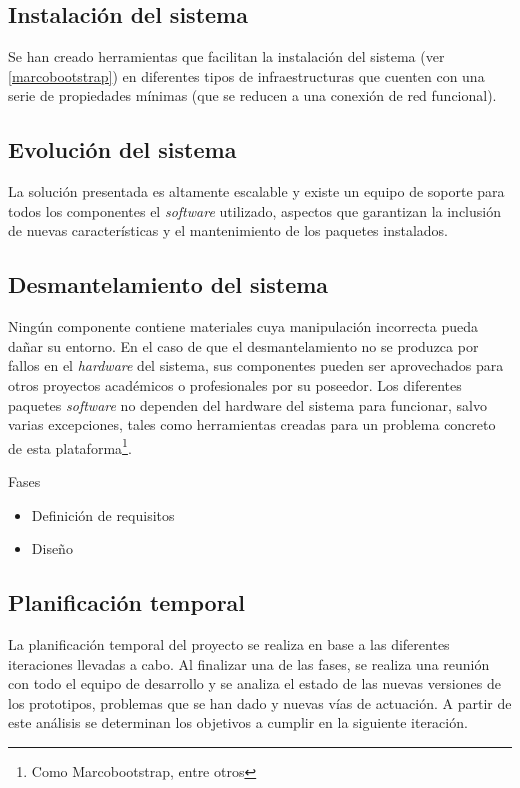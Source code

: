 \subsection{Instalación del sistema}

Se han creado herramientas que facilitan la instalación del sistema (ver \ref{marcobootstrap}) en diferentes tipos de infraestructuras que cuenten con una serie de propiedades mínimas (que se reducen a una conexión de red funcional).

\subsection{Evolución del sistema}

La solución presentada es altamente escalable y existe un equipo de soporte para todos los componentes el \textit{software} utilizado, aspectos que garantizan la inclusión de nuevas características y el mantenimiento de los paquetes instalados.  

\subsection{Desmantelamiento del sistema}

Ningún componente contiene materiales cuya manipulación incorrecta pueda dañar su entorno. En el caso de que el desmantelamiento no se produzca por fallos en el \textit{hardware} del sistema, sus componentes pueden ser aprovechados para otros proyectos académicos o profesionales por su poseedor. Los diferentes paquetes \textit{software} no dependen del hardware del sistema para funcionar, salvo varias excepciones, tales como herramientas creadas para un problema concreto de esta plataforma\footnote{Como Marcobootstrap, entre otros}.

Fases
\begin{itemize}
  \item Definición de requisitos
  \item Diseño
\end{itemize}

\subsection{Planificación temporal}


La planificación temporal del proyecto se realiza en base a las diferentes iteraciones llevadas a cabo. Al finalizar una de las fases, se realiza una reunión con todo el equipo de desarrollo y se analiza el estado de las nuevas versiones de los prototipos, problemas que se han dado y nuevas vías de actuación. A partir de este análisis se determinan los objetivos a cumplir en la siguiente iteración.

